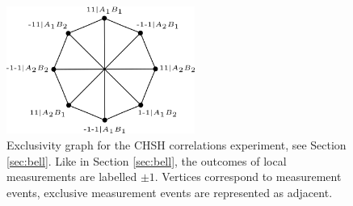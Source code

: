 \begin{figure}
    \centering
    \includegraphics[width=0.55\textwidth]{images/chshexcl.png}
    \caption{Exclusivity graph for the CHSH correlations experiment, see Section \ref{sec:bell}. Like in Section \ref{sec:bell}, the outcomes of local measurements are labelled $\pm 1$. Vertices correspond to measurement events, exclusive measurement events are represented as adjacent.}
    \label{fig:chshexcl}
\end{figure}

